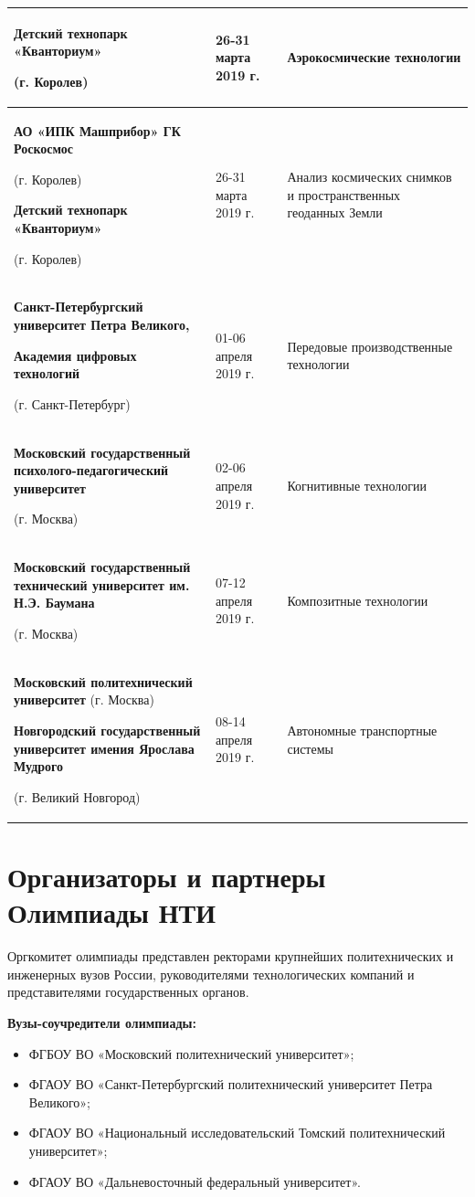 \begin{center}
\begin{longtable}{|p{7.5cm}|p{2.5cm}|p{5cm}|}
        \textbf{Детский технопарк «Кванториум»}

        (г. Королев) & 26-31 марта 2019 г. & Аэрокосмические технологии \\
        \hline
        \textbf{АО «ИПК Машприбор» ГК Роскосмос}

        (г. Королев)

        \textbf{Детский технопарк «Кванториум»}

        (г. Королев) & 26-31 марта 2019 г. & Анализ космических снимков и пространственных геоданных Земли \\
        \hline
        \textbf{Санкт-Петербургский университет Петра Великого,}

        \textbf{Академия цифровых технологий}

        (г. Санкт-Петербург) & 01-06 апреля 2019 г.	& Передовые производственные технологии \\
        \hline
        \textbf{Московский государственный психолого-педагогический университет}
        
        (г. Москва) & 02-06 апреля 2019 г. & Когнитивные технологии \\
        \hline
        \textbf{Московский государственный технический университет им. Н.Э. Баумана}

        (г. Москва) & 07-12 апреля 2019 г. & Композитные технологии \\
        \hline
        \textbf{Московский политехнический университет}
        (г. Москва)

        \textbf{Новгородский государственный университет имения Ярослава Мудрого}

        (г. Великий Новгород) & 08-14 апреля 2019 г. & Автономные транспортные системы\\
        \hline        
    \end{longtable}
\end{center}

\section*{Организаторы и партнеры Олимпиады НТИ}

Оргкомитет олимпиады представлен ректорами крупнейших политехнических и инженерных вузов России, руководителями технологических компаний и представителями государственных органов.

\textbf{Вузы-соучредители олимпиады:}
\begin{itemize}
    \item ФГБОУ ВО «Московский политехнический университет»;
    \item ФГАОУ ВО «Санкт-Петербургский политехнический университет Петра Великого»;
    \item ФГАОУ ВО «Национальный исследовательский Томский политехнический университет»;
    \item ФГАОУ ВО «Дальневосточный федеральный университет».
\end{itemize}

